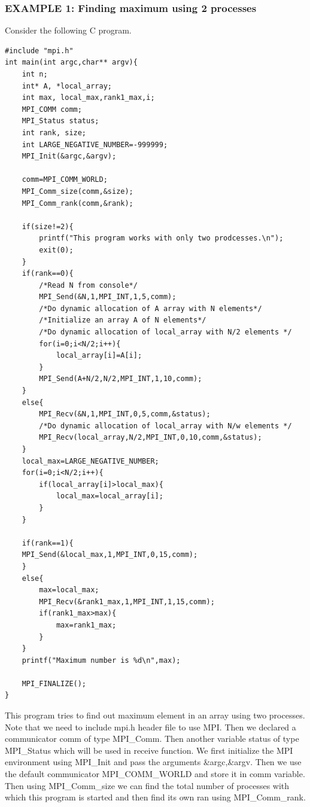 \documentclass[12pt]{book}
\begin{document}
\subsubsection{EXAMPLE 1: Finding maximum using 2 processes}
Consider the following C program.
\begin{lstlisting}
#include "mpi.h"
int main(int argc,char** argv){
    int n;
    int* A, *local_array;
    int max, local_max,rank1_max,i;
    MPI_COMM comm;
    MPI_Status status;
    int rank, size;
    int LARGE_NEGATIVE_NUMBER=-999999;
    MPI_Init(&argc,&argv);

    comm=MPI_COMM_WORLD;
    MPI_Comm_size(comm,&size);
    MPI_Comm_rank(comm,&rank);

    if(size!=2){
        printf("This program works with only two prodcesses.\n");
        exit(0);
    }
    if(rank==0){
        /*Read N from console*/
        MPI_Send(&N,1,MPI_INT,1,5,comm);
        /*Do dynamic allocation of A array with N elements*/
        /*Initialize an array A of N elements*/
        /*Do dynamic allocation of local_array with N/2 elements */
        for(i=0;i<N/2;i++){
            local_array[i]=A[i];
        }
        MPI_Send(A+N/2,N/2,MPI_INT,1,10,comm);
    }
    else{
        MPI_Recv(&N,1,MPI_INT,0,5,comm,&status);
        /*Do dynamic allocation of local_array with N/w elements */
        MPI_Recv(local_array,N/2,MPI_INT,0,10,comm,&status);
    }
    local_max=LARGE_NEGATIVE_NUMBER;
    for(i=0;i<N/2;i++){
        if(local_array[i]>local_max){
            local_max=local_array[i];
        }
    }

    if(rank==1){
    MPI_Send(&local_max,1,MPI_INT,0,15,comm);
    }
    else{
        max=local_max;
        MPI_Recv(&rank1_max,1,MPI_INT,1,15,comm);
        if(rank1_max>max){
            max=rank1_max;
        }
    }
    printf("Maximum number is %d\n",max);

    MPI_FINALIZE();
}
\end{lstlisting}
This program tries to find out maximum element in an array using two processes. Note that we need to include mpi.h header file to use MPI. Then we declared a communicator comm of type MPI\_Comm. Then another variable status of type MPI\_Status which will be used in receive function. We first initialize the MPI environment using MPI\_Init and pass the arguments \&argc,\&argv. Then we use the default communicator MPI\_COMM\_WORLD and store it in comm variable. Then using MPI\_Comm\_size we can find the total number of processes with which this program is started and then find its own ran using MPI\_Comm\_rank.
\end{document}

